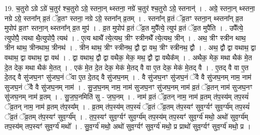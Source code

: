 \documentclass[17pt]{extarticle}
\begin{document}
19. च॒तुरो ऽग्रे ऽग्रे॑ च॒तुर॑ श्च॒तुरो ऽग्रे॒ स्तना॒न् थ्स्तना॒ नग्रे॑ च॒तुर॑ श्च॒तुरो ऽग्रे॒ स्तनान्॑ । . अग्रे॒ स्तना॒न् थ्स्तना॒ नग्रे ऽग्रे॒ स्तना᳚न् व्र॒तं ॅव्र॒तꣳ स्तना॒ नग्रे ऽग्रे॒ स्तना᳚न् व्र॒तम् । . स्तना᳚न् व्र॒तं ॅव्र॒तꣳ स्तना॒न् थ्स्तना᳚न् व्र॒त मुपोप॑ व्र॒तꣳ स्तना॒न् थ्स्तना᳚न् व्र॒त मुप॑ । . व्र॒त मुपोप॑ व्र॒तं ॅव्र॒त मुपै᳚त्ये॒ त्युप॑ व्र॒तं ॅव्र॒त मुपै॑ति । . उपै᳚त्ये॒ त्युपोपै॒ त्यथा थै॒त्युपोपै॒ त्यथ॑ । . ए॒त्य थाथै᳚ त्ये॒त्यथ॒ त्रीꣳ स्त्रीनथै᳚ त्ये॒त्यथ॒ त्रीन् । . अथ॒ त्रीꣳ स्त्रीन थाथ॒ त्रीन थाथ॒ त्रीनथाथ॒ त्रीनथ॑ । . त्रीन थाथ॒ त्रीꣳ स्त्रीनथ॒ द्वौ द्वा वथ॒ त्रीꣳ स्त्रीनथ॒ द्वौ । . अथ॒ द्वौ द्वा वथाथ॒ द्वा वथाथ॒ द्वा वथाथ॒ द्वा वथ॑ । . द्वा वथाथ॒ द्वौ द्वा वथैक॒ मेक॒ मथ॒ द्वौ द्वा वथैक᳚म् । . अथैक॒ मेक॒ मथा थैक॑ मे॒त दे॒त देक॒ मथा थैक॑ मे॒तत् । . एक॑ मे॒त दे॒त देक॒ मेक॑ मे॒तद् वै वा ए॒त देक॒ मेक॑ मे॒तद् वै । . ए॒तद् वै वा ए॒त दे॒तद् वै सु॑जघ॒नꣳ सु॑जघ॒नं ॅवा ए॒त दे॒तद् वै सु॑जघ॒नम् । . वै सु॑जघ॒नꣳ सु॑जघ॒नं ॅवै वै सु॑जघ॒नम् नाम॒ नाम॑ सुजघ॒नं ॅवै वै सु॑जघ॒नम् नाम॑ । . सु॒ज॒घ॒नम् नाम॒ नाम॑ सुजघ॒नꣳ सु॑जघ॒नम् नाम॑ व्र॒तं ॅव्र॒तन् नाम॑ सुजघ॒नꣳ सु॑जघ॒नम् नाम॑ व्र॒तम् । . सु॒ज॒घ॒नमिति॑ सु - ज॒घ॒नम् । . नाम॑ व्र॒तं ॅव्र॒तन् नाम॒ नाम॑ व्र॒तम् त॑प॒स्य॑म् तप॒स्यं॑ ॅव्र॒तन् नाम॒ नाम॑ व्र॒तम् त॑प॒स्य᳚म् । . व्र॒तम् त॑प॒स्य॑म् तप॒स्यं॑ ॅव्र॒तं ॅव्र॒तम् त॑प॒स्यꣳ॑ सुव॒र्ग्यꣳ॑ सुव॒र्ग्य॑म् तप॒स्यं॑ ॅव्र॒तं ॅव्र॒तम् त॑प॒स्यꣳ॑ सुव॒र्ग्य᳚म् । . त॒प॒स्यꣳ॑ सुव॒र्ग्यꣳ॑ सुव॒र्ग्य॑म् तप॒स्य॑म् तप॒स्यꣳ॑ सुव॒र्ग्य॑ मथो॒ अथो॑ सुव॒र्ग्य॑म् तप॒स्य॑म् तप॒स्यꣳ॑ सुव॒र्ग्य॑ मथो᳚ । . सु॒व॒र्ग्य॑ मथो॒ अथो॑ सुव॒र्ग्यꣳ॑ सुव॒र्ग्य॑ मथो॒ प्र प्राथो॑ सुव॒र्ग्यꣳ॑ सुव॒र्ग्य॑ मथो॒ प्र । \newline
\end{document}
